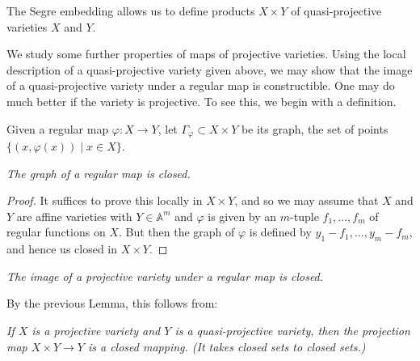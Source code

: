\documentclass[12pt]{amsart}
\begin{document}
The Segre embedding allows us to define products $X\times Y$ of
quasi-projective varieties $X$ and $Y$.


We study some further properties of maps of projective varieties.
Using the local description of a quasi-projective variety given above, we may
show that the image of a quasi-projective variety under a regular map is
constructible. 
One may do much better if the variety is projective.
To see this, we begin with a definition.

Given a regular map $\varphi\colon X\to Y$, let 
$\Gamma_\varphi\subset X\times Y$ be its graph, the set of points
$\{(x,\varphi(x))\mid x\in X\}$. 
\medskip

{\it
The graph of a regular map is closed.}\medskip

\begin{proof}
It suffices to prove this locally in $X\times Y$, and so we may assume that
$X$ and $Y$ are affine varieties with $Y\in {\mathbb A}^m$ and $\varphi$ is
given by an $m$-tuple $f_1,\ldots,f_m$ of regular functions on $X$.
But then the graph of $\varphi$ is defined by 
$y_1-f_1,\ldots,y_m-f_m$, and hence us closed in $X\times Y$.
\end{proof}

{\it 
The image of a projective variety under a regular map is closed.
}\medskip

By the previous Lemma, this follows from:
\medskip

{\it
If $X$ is a projective variety and $Y$ is a quasi-projective variety, then
the projection map $X\times Y \to Y$ is a closed mapping.
(It takes closed sets to closed sets.)}\medskip
\end{document}
